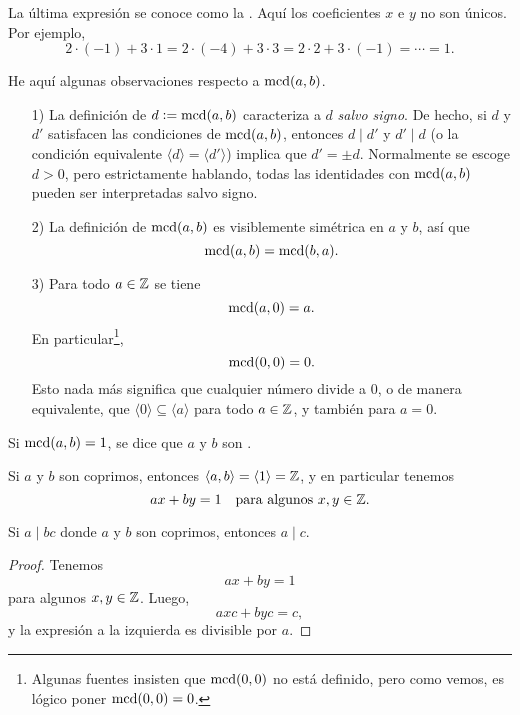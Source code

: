 \documentclass{article}
\numberwithin{equation}{section}
\begin{document}
La última expresión se conoce como la
. Aquí los coeficientes $x$
e $y$ no son únicos. Por ejemplo,
$$2\cdot (-1) + 3\cdot 1 = 2\cdot (-4) + 3\cdot 3 = 2\cdot 2 + 3\cdot (-1) = \cdots = 1.$$

He aquí algunas observaciones respecto a $\operatorname{mcd} (a,b)$.

\begin{enumerate}
\item[1)] La definición de $d \mathrel{\mathop:}= \operatorname{mcd} (a,b)$ caracteriza a $d$
  \emph{salvo signo}. De hecho, si $d$ y $d'$ satisfacen las condiciones de
  $\operatorname{mcd} (a,b)$, entonces $d \mid d'$ y $d' \mid d$ (o la condición equivalente
  $\langle d\rangle = \langle d'\rangle$) implica que $d' = \pm d$. Normalmente
  se escoge $d > 0$, pero estrictamente hablando, todas las identidades con
  $\operatorname{mcd} (a,b)$ pueden ser interpretadas salvo signo.

\item[2)] La definición de $\operatorname{mcd} (a,b)$ es visiblemente simétrica en $a$ y $b$,
  así que
  $$\operatorname{mcd} (a,b) = \operatorname{mcd} (b,a).$$

\item[3)] Para todo $a\in\mathbb{Z}$ se tiene
  $$\operatorname{mcd} (a,0) = a.$$
  En particular\footnote{Algunas fuentes insisten que $\operatorname{mcd} (0,0)$ no está
    definido, pero como vemos, es lógico poner $\operatorname{mcd} (0,0) = 0$.},
  $$\operatorname{mcd} (0,0) = 0.$$
  Esto nada más significa que cualquier número divide a $0$, o de manera
  equivalente, que $\langle 0\rangle \subseteq \langle a\rangle$ para todo
  $a\in\mathbb{Z}$, y también para $a = 0$.
\end{enumerate}

\begin{definicion}
  Si $\operatorname{mcd} (a,b) = 1$, se dice que $a$ y $b$ son
  .
\end{definicion}

Si $a$ y $b$ son coprimos, entonces
$\langle a,b\rangle = \langle 1\rangle = \mathbb{Z}$, y en particular tenemos
$$ax + by = 1\quad\text{para algunos }x,y\in\mathbb{Z}.$$

\begin{observacion}
  Si $a\mid bc$ donde $a$ y $b$ son coprimos, entonces $a\mid c$.

  \begin{proof}
    Tenemos
    $$ax + by = 1$$
    para algunos $x,y\in\mathbb{Z}$. Luego,
    $$axc + byc = c,$$
    y la expresión a la izquierda es divisible por $a$.
  \end{proof}
\end{observacion}
\end{document}
